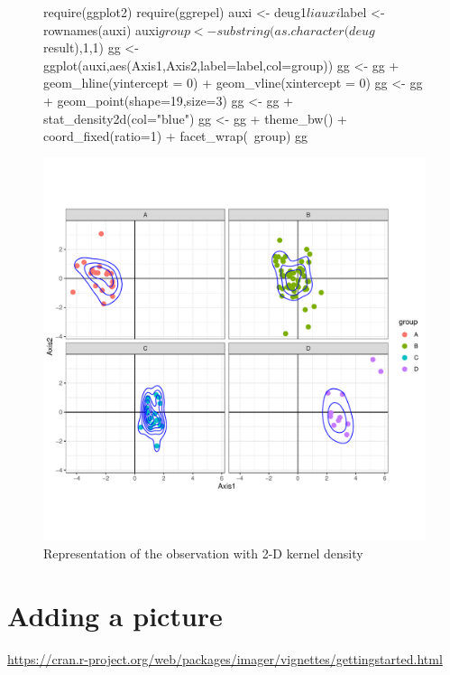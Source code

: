 \documentclass[a4paper,10pt]{article}
\begin{document}
\begin{figure}[H]
\begin{center}
\begin{Schunk}
\begin{Sinput}
  require(ggplot2)
  require(ggrepel)
  auxi <- deug1$li
  auxi$label <- rownames(auxi)
  auxi$group <- substring(as.character(deug$result),1,1)
  gg <- ggplot(auxi,aes(Axis1,Axis2,label=label,col=group))
  gg <- gg + geom_hline(yintercept = 0) + geom_vline(xintercept = 0)
  gg <- gg + geom_point(shape=19,size=3)
  gg <- gg + stat_density2d(col="blue")
  gg <-  gg + theme_bw() + coord_fixed(ratio=1) + facet_wrap(~group)
  gg
\end{Sinput}
\end{Schunk}
\includegraphics{figs/sweave-lidensity3}
\caption{Representation of the observation with 2-D kernel density}
\label{fig:lidensity3}
\end{center}
\end{figure}



\section{Adding a picture}


\url{https://cran.r-project.org/web/packages/imager/vignettes/gettingstarted.html}
\end{document}
